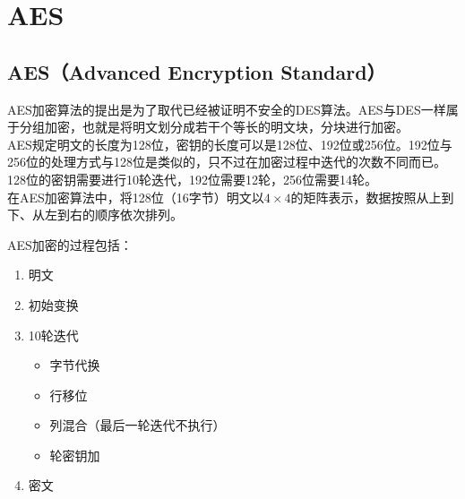 \newpage

\section{AES}

\subsection{AES（Advanced Encryption Standard）}

AES加密算法的提出是为了取代已经被证明不安全的DES算法。AES与DES一样属于分组加密，也就是将明文划分成若干个等长的明文块，分块进行加密。\\

AES规定明文的长度为128位，密钥的长度可以是128位、192位或256位。192位与256位的处理方式与128位是类似的，只不过在加密过程中迭代的次数不同而已。128位的密钥需要进行10轮迭代，192位需要12轮，256位需要14轮。\\

在AES加密算法中，将128位（16字节）明文以$ 4 \times 4 $的矩阵表示，数据按照从上到下、从左到右的顺序依次排列。\\

\begin{table}[H]
    \centering
\end{table}

AES加密的过程包括：

\begin{enumerate}
    \item 明文
    \item 初始变换
    \item 10轮迭代
          \begin{itemize}
              \item 字节代换
              \item 行移位
              \item 列混合（最后一轮迭代不执行）
              \item 轮密钥加
          \end{itemize}
    \item 密文
\end{enumerate}

